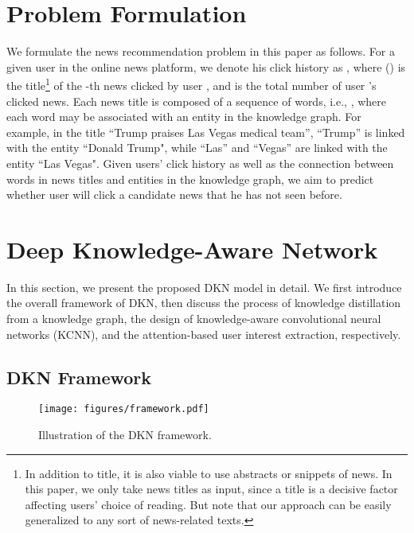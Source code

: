 \documentclass[sigconf]{acmart}
\begin{document}
	
	
	\section{Problem Formulation}
		We formulate the news recommendation problem in this paper as follows.
		For a given user  in the online news platform, we denote his click history as , where  () is the title\footnote{In addition to title, it is also viable to use abstracts or snippets of news. In this paper, we only take news titles as input, since a title is a decisive factor affecting users' choice of reading. But note that our approach can be easily generalized to any sort of news-related texts.} of the -th news clicked by user , and  is the total number of user 's clicked news.
		Each news title  is composed of a sequence of words, i.e., , where each word  may be associated with an entity  in the knowledge graph.
		For example, in the title ``\textsf{Trump praises Las Vegas medical team}'', ``\textsf{Trump}'' is linked with the entity ``\textsf{Donald Trump}", while ``\textsf{Las}'' and ``\textsf{Vegas}'' are linked with the entity ``\textsf{Las Vegas}".
		Given users' click history as well as the connection between words in news titles and entities in the knowledge graph, we aim to predict whether user  will click a candidate news  that he has not seen before.



\section{Deep Knowledge-Aware Network}
	In this section, we present the proposed DKN model in detail.
	We first introduce the overall framework of DKN, then discuss the process of knowledge distillation from a knowledge graph, the design of knowledge-aware convolutional neural networks (KCNN), and the attention-based user interest extraction, respectively.
	
	\subsection{DKN Framework}
		\begin{figure*}[t]
			\centering
  			\texttt{[image: figures/framework.pdf]}
  			\caption{Illustration of the DKN framework.}
  			\label{fig:framework}
		\end{figure*}
	
\end{document}
